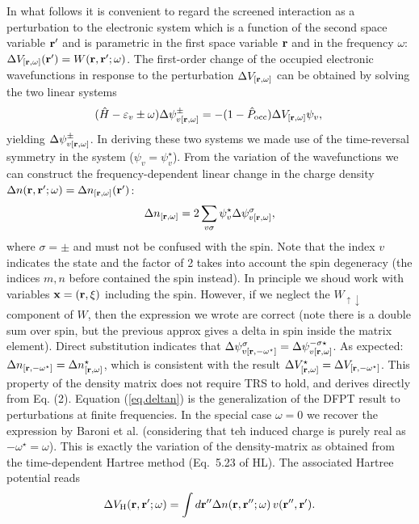 \documentclass[twocolumn,prb,showpacs,superscriptaddress]{revtex4}
\def\w{\omega}
\def\H{\hat{H}}
\def\P{\hat{P}_{\rm occ}}
\def\E{\varepsilon}
\def\s{\sigma}
\def\r{{\bf r}}
\def\rp{{\bf r^\prime}}
\def\rpp{{\bf r^{\prime\prime}}}
\begin{document}
In what follows it is convenient to regard the screened interaction
as a perturbation to the electronic system which is a function of the 
second space variable $\rp$ and is parametric in the first space variable 
$\r$ and in the frequency $\w$: $\Delta V_{[\r,\w]}(\rp) = W(\r,\rp;\w)$.
The first-order change of the occupied electronic wavefunctions in response to the perturbation
$\Delta V_{[\r,\w]}$ can be obtained by solving the two linear systems
  \begin{equation}\label{eq.linsys}\label{eq.linsys.1}
  (\H-\E_v\pm\w) \Delta \psi^\pm_{v[\r,\w]}  = -(1-\P)  \Delta V_{[\r,\w]} \psi_v, \\
  \end{equation}
yielding $\Delta \psi^\pm_{v[\r,\w]}$. In deriving these two systems we made
use of the time-reversal symmetry in the system ($\psi_v = \psi_v^\star$). 
From the variation of the wavefunctions we can construct the frequency-dependent
linear change in the charge density $\Delta n(\r,\rp;\w)=\Delta n_{[\r,\w]}(\rp)$:
  \begin{equation}\label{eq.deltan}
  \Delta n_{[\r,\w]} = 2\sum_{v\s} \psi_v^\star  \Delta \psi^\s_{v[\r,\w]},
  \end{equation}
where $\s=\pm$ and must not be confused with the spin.
Note that the index $v$ indicates the state and the factor of 2 takes into
account the spin degeneracy (the indices $m,n$ before contained the spin instead).
In principle we shoud work with variables ${\bf x}=(\r,\xi)$ including the spin.
However, if we neglect the $W_{\uparrow\downarrow}$ component of $W$, then
the expression we wrote are correct (note there is a double sum over spin,
but the previous approx gives a delta in spin inside the matrix element).
Direct substitution indicates that $\Delta \psi^\s_{v[\r,-\w^\star]} = \Delta \psi_{v[\r,\w]}^{-\s\star}$.
As expected: $\Delta n_{[\r,-\w^\star]}=\Delta n^\star_{[\r,\w]}$, which
is consistent with the result $\Delta V_{[\r,\w]}^\star = \Delta V_{[\r,-\w^\star]}$.\cite{note.w.even}
This property of the density matrix does not require TRS to hold,
and derives directly from Eq. (2).
Equation (\ref{eq.deltan}) is the generalization of the DFPT result
to perturbations at finite frequencies. In the special case $\w=0$
we recover the expression by Baroni et al. (considering that teh induced
charge is purely real as $-\w^\star=\w$).
This is exactly the variation of the density-matrix 
as obtained from the time-dependent Hartree method (Eq.\ 5.23 of HL).
The associated Hartree potential reads
  \begin{equation}
    \Delta V_{\rm H}(\r,\rp;\w) = \int d\rpp \Delta n(\r,\rpp;\w) \, v(\rpp,\rp).
  \end{equation}
\end{document}
